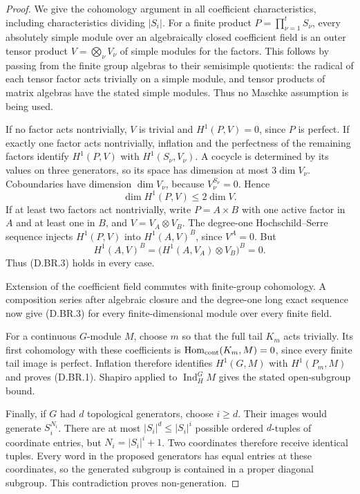 \begin{proof}
We give the cohomology argument in all coefficient
characteristics, including characteristics dividing
$|S_i|$.  For a finite product $P=\prod_{\nu=1}^t S_\nu$,
every absolutely simple module over an algebraically
closed coefficient field is an outer tensor product
$V=\bigotimes_\nu V_\nu$ of simple modules for the
factors.  This follows by passing from the finite
group algebras to their semisimple quotients: the
radical of each tensor factor acts trivially on a
simple module, and tensor products of matrix algebras
have the stated simple modules.  Thus no Maschke
assumption is being used.

If no factor acts nontrivially, $V$ is trivial and
$H^1(P,V)=0$, since $P$ is perfect.  If exactly one
factor acts nontrivially, inflation and the perfectness
of the remaining factors identify $H^1(P,V)$ with
$H^1(S_\nu,V_\nu)$.  A cocycle is determined by its
values on three generators, so its space has dimension
at most $3\dim V_\nu$.  Coboundaries have dimension
$\dim V_\nu$, because $V_\nu^{S_\nu}=0$.  Hence
\[
                       \dim H^1(P,V)\le2\dim V.           \tag{D.BR.3}
\]
If at least two factors act nontrivially, write
$P=A\times B$ with one active factor in $A$ and at
least one in $B$, and $V=V_A\otimes V_B$.
The degree-one Hochschild--Serre sequence injects
$H^1(P,V)$ into $H^1(A,V)^B$, since $V^A=0$.
But
\[
 H^1(A,V)^B
       =\bigl(H^1(A,V_A)\otimes V_B\bigr)^B=0.
\]
Thus (D.BR.3) holds in every case.

Extension of the coefficient field commutes with
finite-group cohomology.  A composition series after
algebraic closure and the degree-one long exact
sequence now give (D.BR.3) for every finite-dimensional
module over every finite field.

For a continuous $G$-module $M$, choose $m$ so that
the full tail $K_m$ acts trivially.  Its first
cohomology with these coefficients is
$\operatorname{Hom}_{\rm cont}(K_m,M)=0$, since every
finite tail image is perfect.  Inflation therefore
identifies $H^1(G,M)$ with $H^1(P_m,M)$ and proves
(D.BR.1).  Shapiro applied to
$\operatorname{Ind}_H^G M$ gives the stated open-subgroup
bound.

Finally, if $G$ had $d$ topological generators, choose
$i\ge d$.  Their images would generate $S_i^{N_i}$.
There are at most $|S_i|^d\le|S_i|^i$ possible ordered
$d$-tuples of coordinate entries, but
$N_i=|S_i|^i+1$.  Two coordinates therefore receive
identical tuples.  Every word in the proposed
generators has equal entries at these coordinates,
so the generated subgroup is contained in a proper
diagonal subgroup.  This contradiction proves
non-generation.
\end{proof}

